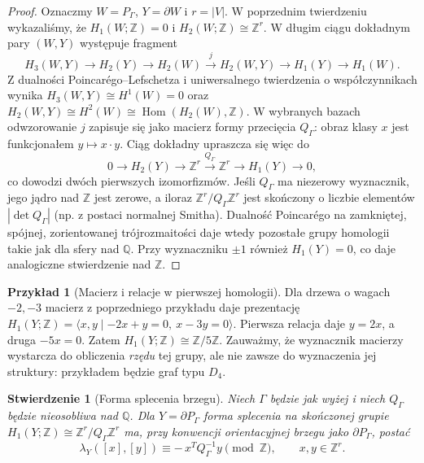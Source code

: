 \documentclass[11pt,a4paper]{report}
\numberwithin{equation}{section}
\theoremstyle{plain}
\newtheorem{stwierdzenie}[twierdzenie]{Stwierdzenie}
\theoremstyle{definition}
\newtheorem{przyklad}[twierdzenie]{Przykład}
\theoremstyle{remark}
\begin{document}
\begin{proof}
Oznaczmy $W=P_\Gamma$, $Y=\partial W$ i $r=|V|$.
W poprzednim twierdzeniu wykazaliśmy, że $H_1(W;\mathbb Z)=0$
i $H_2(W;\mathbb Z)\cong\mathbb Z^r$.
W długim ciągu dokładnym pary $(W,Y)$ występuje fragment
\[
H_3(W,Y)\longrightarrow H_2(Y)\longrightarrow H_2(W)
\xrightarrow{\ j\ }H_2(W,Y)\longrightarrow H_1(Y)
\longrightarrow H_1(W).
\]
Z dualności Poincarégo--Lefschetza i uniwersalnego twierdzenia
o współczynnikach wynika
$H_3(W,Y)\cong H^1(W)=0$ oraz
$H_2(W,Y)\cong H^2(W)\cong\operatorname{Hom}(H_2(W),\mathbb Z)$.
W wybranych bazach odwzorowanie $j$ zapisuje się jako macierz
formy przecięcia $Q_\Gamma$: obraz klasy $x$ jest funkcjonałem
$y\mapsto x\cdot y$. Ciąg dokładny upraszcza się więc do
\[
0\longrightarrow H_2(Y)\longrightarrow\mathbb Z^r
\xrightarrow{Q_\Gamma}\mathbb Z^r
\longrightarrow H_1(Y)\longrightarrow0,
\]
co dowodzi dwóch pierwszych izomorfizmów. Jeśli $Q_\Gamma$
ma niezerowy wyznacznik, jego jądro nad $\mathbb Z$ jest zerowe,
a iloraz $\mathbb Z^r/Q_\Gamma\mathbb Z^r$ jest skończony
o liczbie elementów $|\det Q_\Gamma|$ (np. z postaci normalnej
Smitha). Dualność Poincarégo na zamkniętej, spójnej,
zorientowanej trójrozmaitości daje wtedy pozostałe grupy
homologii takie jak dla sfery nad $\mathbb Q$.
Przy wyznaczniku $\pm1$ również $H_1(Y)=0$, co daje
analogiczne stwierdzenie nad $\mathbb Z$.
\end{proof}

\begin{przyklad}[Macierz i relacje w pierwszej homologii]
Dla drzewa o wagach $-2,-3$ macierz z poprzedniego
przykładu daje prezentację
$H_1(Y;\mathbb Z)=\langle x,y\mid -2x+y=0,\ x-3y=0\rangle$.
Pierwsza relacja daje $y=2x$, a druga $-5x=0$.
Zatem $H_1(Y;\mathbb Z)\cong\mathbb Z/5\mathbb Z$.
Zauważmy, że wyznacznik macierzy wystarcza do obliczenia
\emph{rzędu} tej grupy, ale nie zawsze do wyznaczenia
jej struktury: przykładem będzie graf typu $D_4$.
\end{przyklad}

\begin{stwierdzenie}[Forma splecenia brzegu]
Niech $\Gamma$ będzie jak wyżej i niech $Q_\Gamma$ będzie
nieosobliwa nad $\mathbb Q$. Dla $Y=\partial P_\Gamma$
forma splecenia na skończonej grupie
$H_1(Y;\mathbb Z)\cong\mathbb Z^r/Q_\Gamma\mathbb Z^r$
ma, przy konwencji orientacyjnej brzegu jako $\partial P_\Gamma$,
postać
\[
\lambda_Y([x],[y])\equiv-\,x^TQ_\Gamma^{-1}y
\pmod{\mathbb Z}, \qquad x,y\in\mathbb Z^r.
\]
\end{stwierdzenie}
\end{document}
